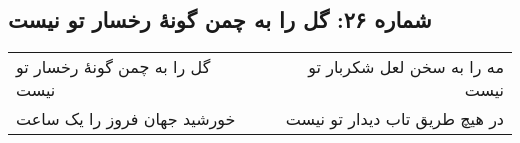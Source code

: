 \begin{center}
\section*{شماره ۲۶: گل را به چمن گونۀ رخسار تو نیست}
\label{sec:026}
\begin{longtable}{l p{0.5cm} r}
گل را به چمن گونهٔ رخسار تو نیست
&&
مه را به سخن لعل شکربار تو نیست
\\
خورشید جهان فروز را یک ساعت
&&
در هیچ طریق تاب دیدار تو نیست
\\
\end{longtable}
\end{center}
